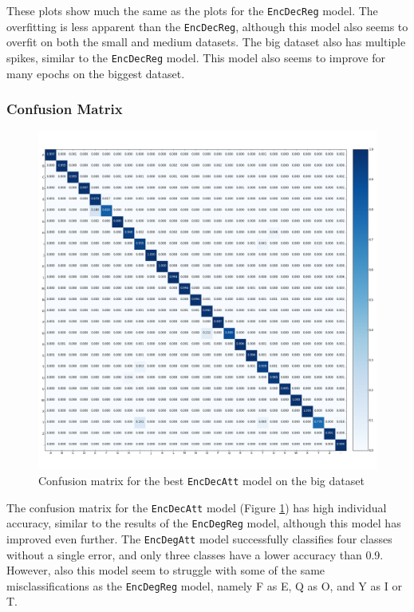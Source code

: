 These plots show much the same as the plots for the {\tt EncDecReg} model. The overfitting is less apparent than the {\tt EncDecReg}, although this model also seems to overfit on both the small and medium datasets. The big dataset also has multiple spikes, similar to the {\tt EncDecReg} model. This model also seems to improve for many epochs on the biggest dataset.

\newpage
\subsubsection{Confusion Matrix}
\begin{figure}[H]
    \centering
    \includegraphics[width=1\textwidth]{fig/results/experiment1/big/encdecatt/confusion_matrix.png}
    \caption{Confusion matrix for the best {\tt EncDecAtt} model on the big dataset}
    \label{fig:result1_big_encdecatt_confusion_matrix}
\end{figure}

The confusion matrix for the {\tt EncDecAtt} model (Figure \ref{fig:result1_big_encdecatt_confusion_matrix}) has high individual accuracy, similar to the results of the {\tt EncDegReg} model, although this model has improved even further. The {\tt EncDegAtt} model successfully classifies four classes without a single error, and only three classes have a lower accuracy than 0.9. However, also this model seem to struggle with some of the same misclassifications as the {\tt EncDegReg} model, namely F as E, Q as O, and Y as I or T.

